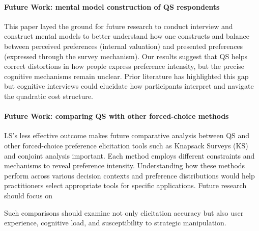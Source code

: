 \paragraph{Future Work: mental model construction of QS respondents}
This paper layed the ground for future research to conduct interview and construct mental models to better understand how one constructs and balance between perceived preferences (internal valuation) and presented preferences (expressed through the survey mechanism). Our results suggest that QS helps correct distortions in how people express preference intensity, but the precise cognitive mechanisms remain unclear. Prior literature has highlighted this gap but cognitive interviews could elucidate how participants interpret and navigate the quadratic cost structure.

\paragraph{Future Work: comparing QS with other forced-choice methods}
LS's less effective outcome makes future comparative analysis between QS and other forced-choice preference elicitation tools such as Knapsack Surveys (KS) and conjoint analysis important. Each method employs different constraints and mechanisms to reveal preference intensity. Understanding how these methods perform across various decision contexts and preference distributions would help practitioners select appropriate tools for specific applications. Future research should focus on 

Such comparisons should examine not only elicitation accuracy but also user experience, cognitive load, and susceptibility to strategic manipulation.










